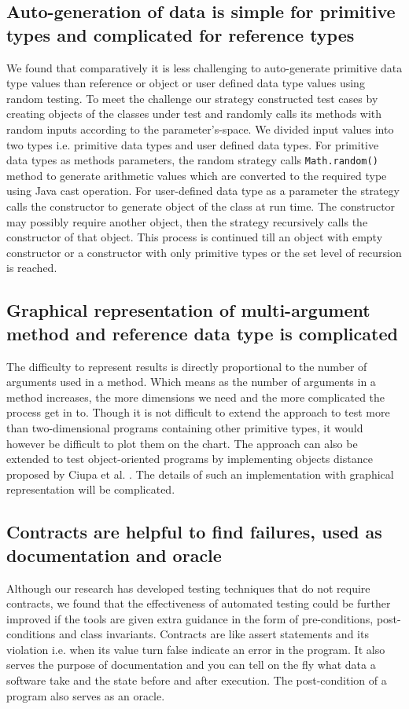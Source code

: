 \subsection{Auto-generation of data is simple for primitive types and complicated for reference types}
We found that comparatively it is less challenging to auto-generate primitive data type values than reference or object or user defined data type values using random testing. To meet the challenge our strategy constructed test cases by creating objects of the classes under test and randomly calls its methods with random inputs according to the parameter's-space. We divided input values into two types i.e. primitive data types and user defined data types. For primitive data types as methods parameters, the random strategy calls \verb+Math.random()+ method to generate arithmetic values which are converted to the required type using Java cast operation. For user-defined data type as a parameter the strategy calls the constructor to generate object of the class at run time. The constructor may possibly require another object, then the strategy recursively calls the constructor of that object. This process is continued till an object with empty constructor or a constructor with only primitive types or the set level of recursion is reached.


\subsection{Graphical representation of multi-argument method and reference data type is complicated}
The difficulty to represent results is directly proportional to the number of arguments used in a method. Which means as the number of arguments in a method increases, the more dimensions we need and the more complicated the process get in to. Though it is not difficult to extend the approach to test more than two-dimensional programs containing other primitive types, it would however be difficult to plot them on the chart. The approach can also be extended to test object-oriented programs by implementing objects distance proposed by Ciupa et al. \cite{ciupa2006object}. The details of such an implementation with graphical representation will be complicated.


\subsection{Contracts are helpful to find failures, used as documentation and oracle}
Although our research has developed testing techniques that do not require contracts, we found that the effectiveness of automated testing could be further improved if the tools are given extra guidance in the form of pre-conditions, post-conditions and class invariants. Contracts are like assert statements and its violation i.e. when its value turn false indicate an error in the program. It also serves the purpose of documentation and you can tell on the fly what data a software take and the state before and after execution. The post-condition of a program also serves as an oracle.







